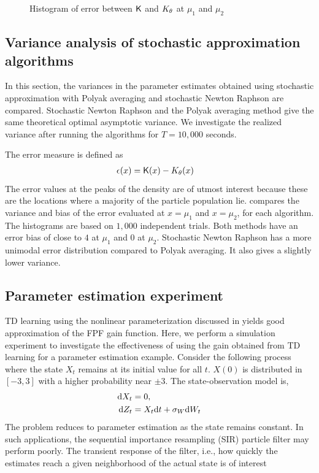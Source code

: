 \begin{figure}[h]
	\caption{ Histogram of error between $\text{\sf K}$ and $K_\theta$ at $\mu_{1}$ and $\mu_{2}$ }
	\label{var_snr_1}
	\vspace{-.15cm}
\end{figure}

\subsection{Variance analysis of stochastic approximation algorithms}
\label{asym_variance}
In this section, the variances in the parameter estimates obtained using stochastic approximation with Polyak averaging and stochastic Newton Raphson are compared. Stochastic Newton Raphson and the Polyak averaging method give the same theoretical optimal asymptotic variance. We investigate the realized variance after running the algorithms for $T=10,000$ seconds.

The error measure is defined as
\begin{equation*}
\begin{aligned}
\epsilon(x) &= \text{\sf K}(x)-K_\theta(x)
\end{aligned}
\end{equation*}
The error values at the peaks of the density are of utmost interest because these are the locations where a majority of the particle population lie.   compares the variance and bias of the error evaluated at $x=\mu_{1}$ and $x=\mu_{2}$, for each algorithm. The histograms are based on $1,000$ independent trials. Both methods have an error bias of close to $4$ at $\mu_{1}$ and $0$ at $\mu_{2}$. Stochastic Newton Raphson has a more unimodal error distribution compared to Polyak averaging. It also gives a slightly lower variance.




\subsection{Parameter estimation experiment}


TD learning using the nonlinear parameterization discussed in  yields good approximation of the FPF gain function. Here, we perform a simulation experiment to investigate the effectiveness of using the gain obtained from TD learning for a parameter estimation example. Consider the following process where the state $X_t$ remains at its initial value for all $t$. $X(0)$ is distributed in $[-3,3]$ with a higher probability near $\pm3$. The state-observation model is,
\begin{equation*}
\begin{aligned}
\text{d} X_t&=0,\quad \\
\text{d} Z_t&= X_t \text{d} t+\sigma_{W}\text{d} W_t
\end{aligned}
\end{equation*}
The problem reduces to parameter estimation as the state remains constant. In such applications, the sequential importance resampling (SIR) particle filter may perform poorly. The transient response of the filter, i.e., how quickly the estimates reach a given neighborhood of the actual state is of interest
